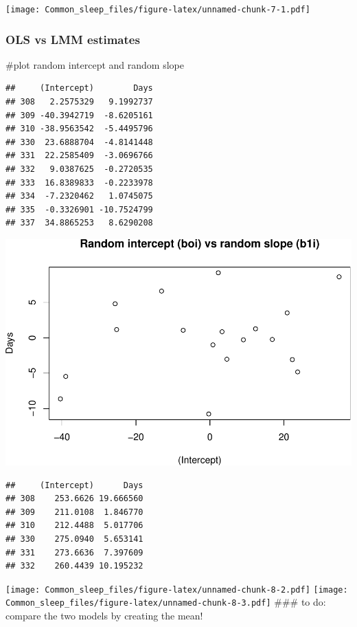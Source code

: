 \documentclass[
]{article}
\begin{document}
\texttt{[image: Common\_sleep\_files/figure-latex/unnamed-chunk-7-1.pdf]}

\hypertarget{ols-vs-lmm-estimates}{%
\subsubsection{OLS vs LMM estimates}\label{ols-vs-lmm-estimates}}

\#plot random intercept and random slope

\begin{verbatim}
##     (Intercept)        Days
## 308   2.2575329   9.1992737
## 309 -40.3942719  -8.6205161
## 310 -38.9563542  -5.4495796
## 330  23.6888704  -4.8141448
## 331  22.2585409  -3.0696766
## 332   9.0387625  -0.2720535
## 333  16.8389833  -0.2233978
## 334  -7.2320462   1.0745075
## 335  -0.3326901 -10.7524799
## 337  34.8865253   8.6290208
\end{verbatim}

\includegraphics{Common_sleep_files/figure-latex/unnamed-chunk-8-1.pdf}

\begin{verbatim}
##     (Intercept)      Days
## 308    253.6626 19.666560
## 309    211.0108  1.846770
## 310    212.4488  5.017706
## 330    275.0940  5.653141
## 331    273.6636  7.397609
## 332    260.4439 10.195232
\end{verbatim}

\texttt{[image: Common\_sleep\_files/figure-latex/unnamed-chunk-8-2.pdf]}
\texttt{[image: Common\_sleep\_files/figure-latex/unnamed-chunk-8-3.pdf]}
\#\#\# to do: compare the two models by creating the mean!
\end{document}
